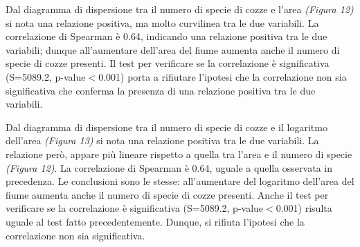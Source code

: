 \documentclass{article} %
\begin{document}
Dal diagramma di dispersione tra il numero di specie di cozze e l'area \textit{(Figura 12)} si nota una relazione positiva, ma molto curvilinea tra le due variabili.  
La correlazione di Spearman è 0.64, indicando una relazione positiva tra le due variabili; dunque all'aumentare dell'area del fiume aumenta anche il numero di specie di cozze presenti.
Il test per verificare se la correlazione è significativa (S=5089.2, p-value$<$0.001) porta a rifiutare l'ipotesi che la correlazione non sia significativa che conferma la presenza di una relazione positiva tra le due variabili.

Dal diagramma di dispersione tra il numero di specie di cozze e il logaritmo dell'area \textit{(Figura 13)} si nota una relazione positiva tra le due variabili. La relazione però, appare più lineare rispetto a quella tra l'area e il numero di specie \textit{(Figura 12)}.  
La correlazione di Spearman è 0.64, uguale a quella osservata in precedenza. Le conclusioni sono le stesse: all'aumentare del logaritmo dell'area del fiume aumenta anche il numero di specie di cozze presenti.
Anche il test per verificare se la correlazione è significativa (S=5089.2, p-value$<$0.001) risulta uguale al test fatto precedentemente. Dunque, si rifiuta l'ipotesi che la correlazione non sia significativa.
\end{document}
